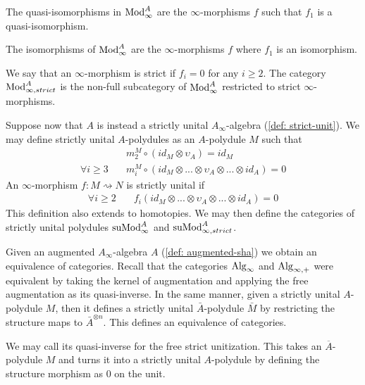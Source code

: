 \documentclass[../thesis.tex]{subfiles}
\begin{document}
            The quasi-isomorphisms in $\tt{Mod}_\infty^A$ are the $\infty$-morphisms $f$ such that $f_1$ is a quasi-isomorphism.

            \begin{remark}
                The isomorphisms of $\tt{Mod}_\infty^A$ are the $\infty$-morphisms $f$ where $f_1$ is an isomorphism.
            \end{remark}

            We say that an $\infty$-morphism is strict if $f_i = 0$ for any $i\geq 2$. The category $\tt{Mod}_{\infty, strict}^A$ is the non-full subcategory of $\tt{Mod}_\infty^A$ restricted to strict $\infty$-morphisms.

            Suppose now that $A$ is instead a strictly unital $A_\infty$-algebra (\ref{def: strict-unit}). We may define strictly unital $A$-polydules as an $A$-polydule $M$ such that
            \begin{align*}
                & m^M_2\circ (id_M \otimes \upsilon_A) = id_M \\
                \forall i\geq 3\quad & m^M_i\circ (id_M \otimes ... \otimes \upsilon_A \otimes ... \otimes id_A) = 0
            \end{align*}
            An $\infty$-morphism $f : M \rightsquigarrow N$ is strictly unital if
            \begin{align*}
                \forall i\geq 2 \quad & f_i(id_M \otimes ... \otimes \upsilon_A \otimes ... \otimes id_A) = 0 
            \end{align*}
            This definition also extends to homotopies. We may then define the categories of strictly unital polydules $\tt{suMod}_\infty^A$ and $\tt{suMod}_{\infty, strict}^A$.

            Given an augmented $A_\infty$-algebra $A$ (\ref{def: augmented-sha}) we obtain an equivalence of categories. Recall that the categories $\tt{Alg}_\infty$ and $\tt{Alg}_{\infty,+}$ were equivalent by taking the kernel of augmentation and applying the free augmentation as its quasi-inverse. In the same manner, given a strictly unital $A$-polydule $M$, then it defines a strictly unital $\bar{A}$-polydule $\bar{M}$ by restricting the structure maps to $\bar{A}^{\otimes n}$. This defines an equivalence of categories.
            \begin{center}
            \end{center}
            We may call its quasi-inverse for the free strict unitization. This takes an $\overline{A}$-polydule $M$ and turns it into a strictly unital $A$-polydule by defining the structure morphism as $0$ on the unit.
\end{document}
